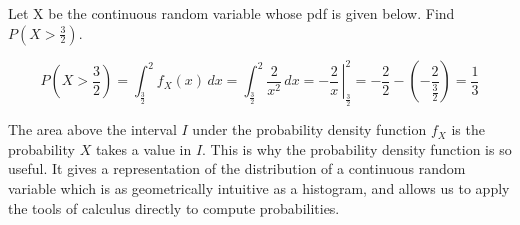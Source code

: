 \begin{example} Let X be the continuous random variable whose pdf is given below. Find $P(X > \frac{3}{2})$.

\begin{center}
    \begin{minipage}{.5\textwidth}
        \centering
        \renewcommand*{\arraystretch}{1.35}
\vspace{1.25em}
\renewcommand*{\arraystretch}{1}
    \end{minipage}%
    \begin{minipage}{0.5\textwidth}
        \centering
\end{minipage}
\end{center}

$$P(X > \textstyle\frac{3}{2}) = \displaystyle\int_{\frac{3}{2}}^{2} f_X(x) \, dx = \int_{\frac{3}{2}}^{2} \frac{2}{x^2} \, dx =  \left.-\frac{2}{x}\,\right|_{\frac{3}{2}}^{2} = -\frac{2}{2} - \left(- \frac{2}{\frac{3}{2}}\right) = \frac{1}{3}$$
\end{example}

\begin{keypoint}
The area above the interval $I$ under the probability density function $f_X$ is the probability $X$ takes a value in $I$. This is why the probability density function is so useful. It gives a representation of the distribution of a continuous random variable which is as geometrically intuitive as a histogram, and allows us to apply the tools of calculus directly to compute probabilities.
\end{keypoint}

